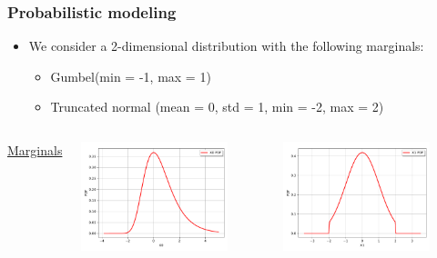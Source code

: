 \documentclass{beamer}
\begin{document}
\begin{frame}[containsverbatim]
\frametitle{Probabilistic modeling}

\scriptsize{

\begin{itemize}
\item We consider a 2-dimensional distribution with the following marginals: 
\begin{itemize}
\tiny
\item Gumbel(min = -1, max = 1)
\item Truncated normal (mean = 0, std = 1, min = -2, max = 2)
\end{itemize}
\end{itemize}

\begin{columns}

\underline{Marginals}

    \includegraphics[width=0.8\textwidth]{figures/Marg1.pdf}

    \includegraphics[width=0.8\textwidth]{figures/Marg2.pdf}



\end{columns}}
\end{frame}
\end{document}

